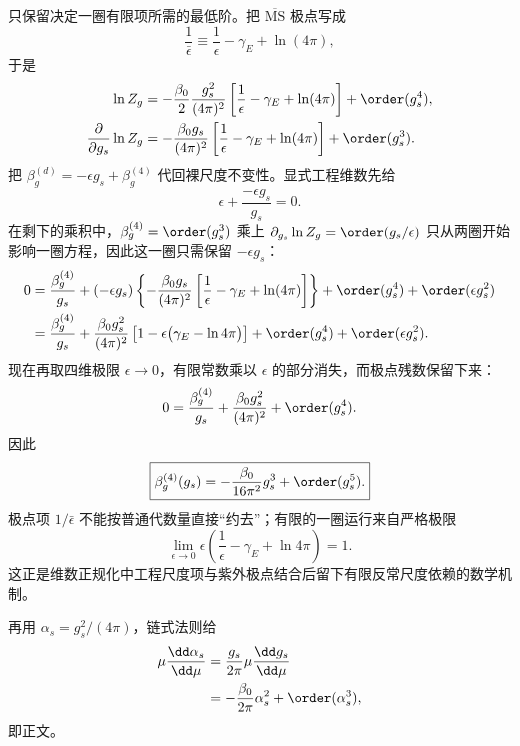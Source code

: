 \begin{derivation}
只保留决定一圈有限项所需的最低阶。把 $\overline{\mathrm{MS}}$ 极点写成
\begin{equation*}
 \frac1{\bar\epsilon}
 \equiv
 \frac1\epsilon-\gamma_E+\ln(4\pi),
\end{equation*}
于是
\begin{align*}
\ln Z_g
&=-\frac{\beta_0}{2}
\frac{g_s^2}{(4\pi)^2}
\left[\frac1\epsilon-\gamma_E+\ln(4\pi)\right]
+\order(g_s^4),\\
\frac{\partial}{\partial g_s}\ln Z_g
&=-\frac{\beta_0 g_s}{(4\pi)^2}
\left[\frac1\epsilon-\gamma_E+\ln(4\pi)\right]
+\order(g_s^3).
\end{align*}
把 $\beta_g^{(d)}=-\epsilon g_s+\beta_g^{(4)}$ 代回裸尺度不变性。显式工程维数先给
\begin{equation*}
 \epsilon+\frac{-\epsilon g_s}{g_s}=0.
\end{equation*}
在剩下的乘积中，$\beta_g^{(4)}=\order(g_s^3)$ 乘上 $\partial_{g_s}\ln Z_g=\order(g_s/\epsilon)$ 只从两圈开始影响一圈方程，因此这一圈只需保留 $-\epsilon g_s$：
\begin{align*}
0
={}&\frac{\beta_g^{(4)}}{g_s}
+(-\epsilon g_s)
\left\{-\frac{\beta_0 g_s}{(4\pi)^2}
\left[\frac1\epsilon-\gamma_E+\ln(4\pi)\right]\right\}
+\order(g_s^4)+\order(\epsilon g_s^2)\\
={}&\frac{\beta_g^{(4)}}{g_s}
+\frac{\beta_0g_s^2}{(4\pi)^2}
\left[1-\epsilon\bigl(\gamma_E-\ln4\pi\bigr)\right]
+\order(g_s^4)+\order(\epsilon g_s^2).
\end{align*}
现在再取四维极限 $\epsilon\to0$，有限常数乘以 $\epsilon$ 的部分消失，而极点残数保留下来：
\begin{equation*}
0=\frac{\beta_g^{(4)}}{g_s}
+\frac{\beta_0g_s^2}{(4\pi)^2}
+\order(g_s^4).
\end{equation*}
因此
\begin{equation*}
\boxed{
\beta_g^{(4)}(g_s)
=-\frac{\beta_0}{16\pi^2}g_s^3
+\order(g_s^5).}
\end{equation*}
极点项 $1/\bar\epsilon$ 不能按普通代数量直接“约去”；有限的一圈运行来自严格极限
\begin{equation*}
 \lim_{\epsilon\to0}
 \epsilon\left(\frac1\epsilon-\gamma_E+\ln4\pi\right)=1.
\end{equation*}
这正是维数正规化中工程尺度项与紫外极点结合后留下有限反常尺度依赖的数学机制。

再用 \(\alpha_s=g_s^2/(4\pi)\)，链式法则给
\begin{align*}
\mu\frac{\dd\alpha_s}{\dd\mu}
&=\frac{g_s}{2\pi}
\mu\frac{\dd g_s}{\dd\mu}\\
&=-\frac{\beta_0}{2\pi}\alpha_s^2
+\order(\alpha_s^3),
\end{align*}
即正文。


\end{derivation}
